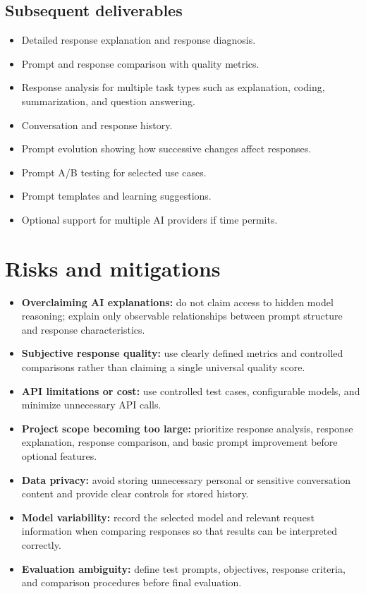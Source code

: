 \documentclass[11pt,a4paper]{article}
\begin{document}
\subsection{Subsequent deliverables}

\begin{itemize}[leftmargin=0.7cm]
    \item Detailed response explanation and response diagnosis.
    \item Prompt and response comparison with quality metrics.
    \item Response analysis for multiple task types such as explanation,
    coding, summarization, and question answering.
    \item Conversation and response history.
    \item Prompt evolution showing how successive changes affect responses.
    \item Prompt A/B testing for selected use cases.
    \item Prompt templates and learning suggestions.
    \item Optional support for multiple AI providers if time permits.
\end{itemize}

\section{Risks and mitigations}

\begin{itemize}[leftmargin=0.7cm]
    \item \textbf{Overclaiming AI explanations:} do not claim access to hidden
    model reasoning; explain only observable relationships between prompt
    structure and response characteristics.
    \item \textbf{Subjective response quality:} use clearly defined metrics
    and controlled comparisons rather than claiming a single universal
    quality score.
    \item \textbf{API limitations or cost:} use controlled test cases,
    configurable models, and minimize unnecessary API calls.
    \item \textbf{Project scope becoming too large:} prioritize response
    analysis, response explanation, response comparison, and basic prompt
    improvement before optional features.
    \item \textbf{Data privacy:} avoid storing unnecessary personal or
    sensitive conversation content and provide clear controls for stored
    history.
    \item \textbf{Model variability:} record the selected model and relevant
    request information when comparing responses so that results can be
    interpreted correctly.
    \item \textbf{Evaluation ambiguity:} define test prompts, objectives,
    response criteria, and comparison procedures before final evaluation.
\end{itemize}
\end{document}
